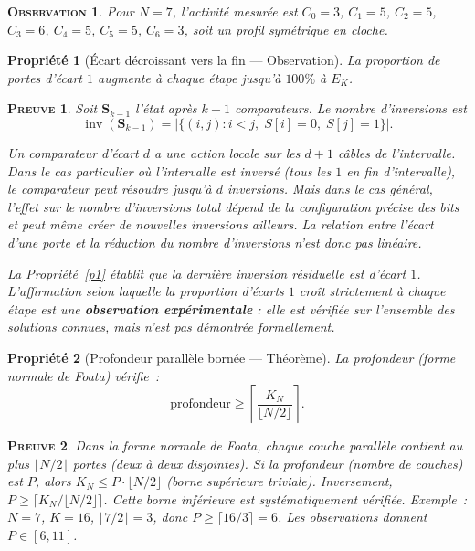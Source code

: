 \documentclass[11pt,a4paper]{article}
\theoremstyle{propretheoreme}
\newtheorem{propriete}{Propriété}
\newtheorem*{observation}{\small\textsc{Observation}}
\theoremstyle{proprepreuve}
\newtheorem*{preuve}{\small\textsc{Preuve}}
\theoremstyle{proprecorollaire}
\begin{document}
\begin{observation}
Pour $N=7$, l'activité mesurée est $C_0=3$, $C_1=5$, $C_2=5$, $C_3=6$, $C_4=5$, $C_5=5$, $C_6=3$, soit un profil symétrique en cloche.
\end{observation}

\begin{propriete}[Écart décroissant vers la fin --- Observation]\label{p7}
La proportion de portes d'écart $1$ augmente à chaque étape jusqu'à $100\%$ à $E_K$.
\end{propriete}

\begin{preuve}
Soit $\mathbf{S}_{k-1}$ l'état après $k-1$ comparateurs. Le nombre d'inversions est
\[
\operatorname{inv}(\mathbf{S}_{k-1}) = \bigl|\{(i,j) : i<j,\; S[i]=0,\; S[j]=1\}\bigr|.
\]

Un comparateur d'écart $d$ a une action locale sur les $d+1$ câbles de l'intervalle. Dans le cas particulier où l'intervalle est inversé (tous les $1$ en fin d'intervalle), le comparateur peut résoudre jusqu'à $d$ inversions. Mais dans le cas général, l'effet sur le nombre d'inversions total dépend de la configuration précise des bits et peut même créer de nouvelles inversions ailleurs. La relation entre l'écart d'une porte et la réduction du nombre d'inversions n'est donc pas linéaire.

La Propriété~\ref{p1} établit que la dernière inversion résiduelle est d'écart $1$. L'affirmation selon laquelle la proportion d'écarts $1$ croît strictement à chaque étape est une \textbf{observation expérimentale} : elle est vérifiée sur l'ensemble des solutions connues, mais n'est pas démontrée formellement.
\end{preuve}

\begin{propriete}[Profondeur parallèle bornée --- Théorème]\label{p8}
La profondeur (forme normale de Foata) vérifie~:
\[
\text{profondeur} \ge \left\lceil \frac{K_N}{\lfloor N/2\rfloor} \right\rceil.
\]
\end{propriete}

\begin{preuve}
Dans la forme normale de Foata, chaque couche parallèle contient au plus $\lfloor N/2\rfloor$ portes (deux à deux disjointes). Si la profondeur (nombre de couches) est $P$, alors $K_N \le P \cdot \lfloor N/2\rfloor$ (borne supérieure triviale). Inversement, $P \ge \lceil K_N / \lfloor N/2\rfloor \rceil$. Cette borne inférieure est systématiquement vérifiée. Exemple~: $N=7$, $K=16$, $\lfloor 7/2\rfloor = 3$, donc $P \ge \lceil 16/3\rceil = 6$. Les observations donnent $P \in [6,11]$.
\end{preuve}
\end{document}
